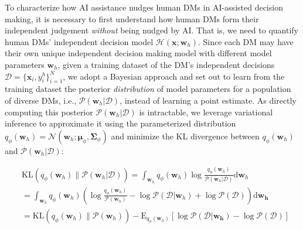 \documentclass[letterpaper]{article} %
\begin{document}
To characterize how AI assistance nudges human DMs in AI-assisted decision making, 
it is necessary to first understand how human DMs form their independent judgement {\em without} being nudged by AI. That is, we need to quantify human DMs' independent decision model $\mathcal{H}(\bm{x};\bm{w}_h)$.  Since each DM may have their own unique independent decision making model with different model parameters $\bm{w}_h$, given a training dataset of the DM's independent decisions $ \mathcal{D} = \{\bm{x}_i, y_i^{h}\}_{i=1}^{N}$, we adopt a Bayesian approach and set out to learn from the training dataset the posterior {\em distribution} of model parameters for a population of diverse DMs, i.e., $\mathcal{P}(\bm{w}_h|\mathcal{D})$,  instead of learning a point estimate. As directly computing this posterior $\mathcal{P}(\bm{w}_h|\mathcal{D})$ is intractable, we leverage variational inference to approximate it using the parameterized distribution $q_{\phi}(\bm{w}_h) = \mathcal{N}(\bm{w}_h;\bm{\mu}_{\phi},\bm{\Sigma}_{\phi})$ and minimize the KL divergence between $q_{\phi}(\bm{w}_h)$ and $\mathcal{P}(\bm{w}_h|\mathcal{D})$:
\begin{small}
\begin{equation}
\begin{split}    
    &\mbox{KL}(q_{\phi}(\bm{w}_h)\|\mathcal{P}(\bm{w}_h|\mathcal{D})) = \int_{\bm{w}_h} q_{\phi}(\bm{w}_h) \log \frac{ q_{\phi}(\bm{w}_h)}{\mathcal{P}(\bm{w}_h|\mathcal{D})} \mathrm{d}\bm{w}_h  \\
    & =\int_{\bm{w}_h} q_{\phi}(\bm{w}_h) ( \log\frac{ q_{\phi}(\bm{w}_h)}{ \mathcal{P}(\bm{w}_h) } - \log \mathcal{P}(\mathcal{D}|\bm{w}_h) + \log \mathcal{P}(\mathcal{D}) )\mathrm{d}\bm{\bm{w}_h} \\
    & =  \mbox{KL}(q_{\phi}(\bm{w}_h)\|\mathcal{P}(\bm{w}_h)) -  \mathrm{E}_{q_{\phi}(\bm{w}_h)}[\log \mathcal{P}(\mathcal{D}|\bm{\bm{w}_h}) -\log \mathcal{P}(\mathcal{D})]
\end{split}
\end{equation}
\end{small}
\end{document}
